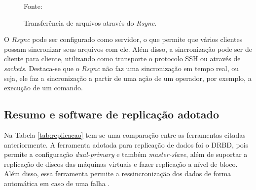 \begin{figure}[h!]
 \centering
 \caption{Transferência de arquivos através do \textit{Rsync}.}
 Fonte: \citet{lopez2012}
 \label{fig:rsync}
\end{figure}


O \textit{Rsync} pode ser configurado como servidor, o que permite que vários clientes possam sincronizar seus arquivos com ele. 
Além disso, a sincronização pode ser de cliente para cliente, utilizando como transporte o protocolo \ac{SSH} ou através de \textit{sockets}.
Destaca-se que o \textit{Rsync} não faz uma sincronização em tempo real, ou seja, ele faz a sincronização a partir de uma ação de um operador, 
por exemplo, a execução de um comando.


\newpage
\subsection{Resumo e software de replicação adotado}
\label{section:replicacaoescolhido}

Na Tabela \ref{tab:replicacao} tem-se uma comparação entre as ferramentas citadas anteriormente. 
A ferramenta adotada para replicação de dados foi o \ac{DRBD}, pois permite a configuração \textit{dual-primary} e também \textit{master-slave}, 
além de suportar a replicação de discos das máquinas virtuais e fazer replicação a nível de bloco. Além disso, essa ferramenta permite a 
ressincronização dos dados de forma automática em caso de uma falha \cite{drbd}.

